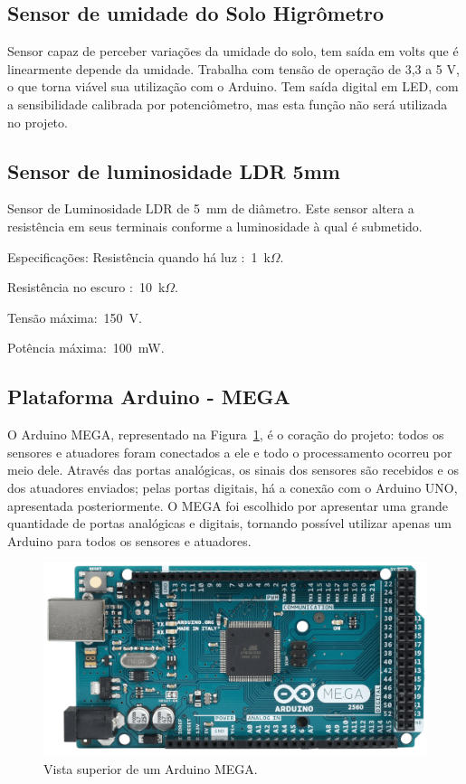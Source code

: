 \documentclass[a4paper,12pt]{report}
\begin{document}
		\subsection{Sensor de umidade do Solo Higrômetro}
		Sensor capaz de perceber variações da umidade do solo, tem saída em volts que é linearmente depende da umidade.
		Trabalha com tensão de operação de 3,3 a 5 V, o que torna viável sua utilização com o Arduino. Tem saída digital em LED, com a sensibilidade calibrada por potenciômetro, mas esta função não será utilizada no projeto.
	
		\subsection{Sensor de luminosidade LDR 5mm}
		
		Sensor de Luminosidade LDR de 5~mm de diâmetro. Este sensor altera a resistência em seus terminais conforme a luminosidade à qual é submetido.
		
		Especificações:
		Resistência quando há luz :~1~k$\Omega$.
		
		Resistência no escuro :~10~k$\Omega$.
		
		Tensão máxima:~150~V.
		
		Potência máxima:~100~mW.
		
		\subsection{Plataforma Arduino - MEGA}	
		 
		O Arduino MEGA, representado na Figura~\ref{fig:MEGA}, é o coração do projeto: todos os sensores e atuadores foram conectados a ele e todo o processamento ocorreu por meio dele. Através das portas analógicas, os sinais dos sensores são recebidos e os dos atuadores enviados; pelas portas digitais, há a conexão com o Arduino UNO, apresentada posteriormente. O MEGA foi escolhido por apresentar uma grande quantidade de portas analógicas e digitais, tornando possível utilizar apenas um Arduino para todos os sensores e atuadores. 
		
		\begin{figure}[!h]
			\centering
			\includegraphics[width=0.6\linewidth]{figs/ARDUINO_MEGA_A03}
			\caption{Vista superior de um Arduino MEGA.}
			\label{fig:MEGA}
		\end{figure}
		
\end{document}
